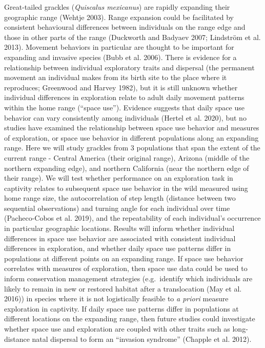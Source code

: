 \documentclass[
]{article}
\begin{document}
Great-tailed grackles (\emph{Quiscalus mexicanus}) are rapidly expanding
their geographic range (Wehtje 2003). Range expansion could be
facilitated by consistent behavioural differences between individuals on
the range edge and those in other parts of the range (Duckworth and
Badyaev 2007; Lindström et al. 2013). Movement behaviors in particular
are thought to be important for expanding and invasive species (Bubb et
al. 2006). There is evidence for a relationship between individual
exploratory traits and dispersal (the permanent movement an individual
makes from its birth site to the place where it reproduces; Greenwood
and Harvey 1982), but it is still unknown whether individual differences
in exploration relate to adult daily movement patterns within the home
range (``space use''). Evidence suggests that daily space use behavior
can vary consistently among individuals (Hertel et al. 2020), but no
studies have examined the relationship between space use behavior and
measures of exploration, or space use behavior in different populations
along an expanding range. Here we will study grackles from 3 populations
that span the extent of the current range - Central America (their
original range), Arizona (middle of the northern expanding edge), and
northern California (near the northern edge of their range). We will
test whether performance on an exploration task in captivity relates to
subsequent space use behavior in the wild measured using home range
size, the autocorrelation of step length (distance between two
sequential observations) and turning angle for each individual over time
(Pacheco-Cobos et al. 2019), and the repeatability of each individual's
occurrence in particular geographic locations. Results will inform
whether individual differences in space use behavior are associated with
consistent individual differences in exploration, and whether daily
space use patterns differ in populations at different points on an
expanding range. If space use behavior correlates with measures of
exploration, then space use data could be used to inform conservation
management strategies (e.g.~identify which individuals are likely to
remain in new or restored habitat after a translocation (May et al.
2016)) in species where it is not logistically feasible to \emph{a
priori} measure exploration in captivity. If daily space use patterns
differ in populations at different locations on the expanding range,
then future studies could investigate whether space use and exploration
are coupled with other traits such as long-distance natal dispersal to
form an ``invasion syndrome'' (Chapple et al. 2012).
\end{document}
